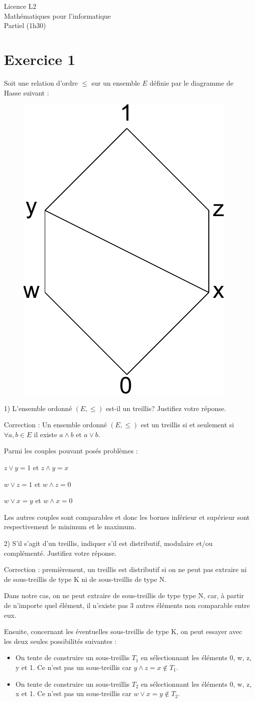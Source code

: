 \documentclass[a4paper,11pt]{article}
\begin{document}
\begin{center}
\Large{Licence L2\\Mathématiques pour l'informatique \\Partiel (1h30)}
\end{center}

\section*{Exercice 1}

Soit une relation d'ordre $\leq$ sur un ensemble $E$ définie par le diagramme de Hasse suivant :

\begin{figure}[h!]
	\centering
	\includegraphics[width=0.15\linewidth]{./exo1.pdf}
\end{figure}

1) L'ensemble ordonné $(E, \leq)$ est-il un treillis? Justifiez votre réponse.

Correction : Un ensemble ordonné $(E, \leq)$ est un treillis si et seulement si $\forall a, b \in E $ il existe $a \wedge b$ et $a \vee b$.

Parmi les couples pouvant posés problèmes :

$z \vee y = 1$ et $z \wedge y = x$

$w \vee z = 1$ et $w \wedge z = 0$

$w \vee x = y$ et $w \wedge x = 0$

Les autres couples sont comparables et donc les bornes inférieur et supérieur sont respectivement le minimum et le maximum.

2) S'il s'agit d'un treillis, indiquer s'il est distributif, modulaire et/ou complémenté. Justifiez votre réponse.

Correction : premièrement, un treillis est distributif si on ne peut pas extraire ni de sous-treillis de type K ni de sous-treillis de type N. 

Dans notre cas, on ne peut extraire de sous-treillis de type type N, car, à partir de n'importe quel élément, il n'existe pas 3 autres éléments non comparable entre eux.

Ensuite, concernant les éventuelles sous-treillis de type K, on peut essayer avec les deux seules possibilités suivantes :
\begin{itemize}
	\item On tente de construire un sous-treillis $T_1$ en sélectionnant les éléments 0, w, z, y et 1. Ce n'est pas un sous-treillis car $y \wedge z = x \notin T_1$.
	\item On tente de construire un sous-treillis $T_2$ en sélectionnant les éléments 0, w, z, x et 1. Ce n'est pas un sous-treillis car $w \vee x = y \notin T_2$.
\end{itemize}
\end{document}
